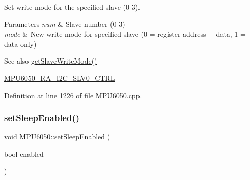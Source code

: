 Set write mode for the specified slave (0-\/3). 
\begin{DoxyParams}{Parameters}
{\em num} & Slave number (0-\/3) \\
\hline
{\em mode} & New write mode for specified slave (0 = register address + data, 1 = data only) \\
\hline
\end{DoxyParams}
\begin{DoxySeeAlso}{See also}
\mbox{\hyperlink{classMPU6050_adb99955fa66300b1f0bedfcdd8187412}{get\+Slave\+Write\+Mode()}} 

\mbox{\hyperlink{MPU6050_8h_a70ce4d71982a1e3fb2be9b71f40da786}{M\+P\+U6050\+\_\+\+R\+A\+\_\+\+I2\+C\+\_\+\+S\+L\+V0\+\_\+\+C\+T\+RL}} 
\end{DoxySeeAlso}


Definition at line 1226 of file M\+P\+U6050.\+cpp.


\begin{DoxyCode}{0}

\end{DoxyCode}
\mbox{\label{classMPU6050_a15ec5f8e7daf235f507c1d8b96af051a}} 
\subsubsection{\texorpdfstring{setSleepEnabled()}{setSleepEnabled()}}
{\footnotesize\ttfamily void M\+P\+U6050\+::set\+Sleep\+Enabled (\begin{DoxyParamCaption}\item[{bool}]{enabled }\end{DoxyParamCaption})}

